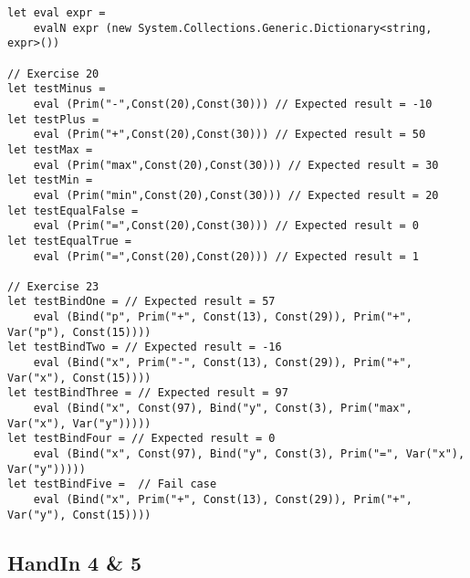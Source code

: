 \begin{lstlisting}
let eval expr = 
    evalN expr (new System.Collections.Generic.Dictionary<string, expr>())

// Exercise 20
let testMinus = 
    eval (Prim("-",Const(20),Const(30))) // Expected result = -10
let testPlus = 
    eval (Prim("+",Const(20),Const(30))) // Expected result = 50
let testMax = 
    eval (Prim("max",Const(20),Const(30))) // Expected result = 30
let testMin = 
    eval (Prim("min",Const(20),Const(30))) // Expected result = 20
let testEqualFalse = 
    eval (Prim("=",Const(20),Const(30))) // Expected result = 0
let testEqualTrue = 
    eval (Prim("=",Const(20),Const(20))) // Expected result = 1

// Exercise 23
let testBindOne = // Expected result = 57
    eval (Bind("p", Prim("+", Const(13), Const(29)), Prim("+", Var("p"), Const(15)))) 
let testBindTwo = // Expected result = -16
    eval (Bind("x", Prim("-", Const(13), Const(29)), Prim("+", Var("x"), Const(15)))) 
let testBindThree = // Expected result = 97
    eval (Bind("x", Const(97), Bind("y", Const(3), Prim("max", Var("x"), Var("y"))))) 
let testBindFour = // Expected result = 0
    eval (Bind("x", Const(97), Bind("y", Const(3), Prim("=", Var("x"), Var("y"))))) 
let testBindFive =  // Fail case
    eval (Bind("x", Prim("+", Const(13), Const(29)), Prim("+", Var("y"), Const(15))))
\end{lstlisting}
\subsection{HandIn 4 \& 5}
\label{Appendix_FSharp_Melnyk_4and5}
\begin{lstlisting}
\end{lstlisting}